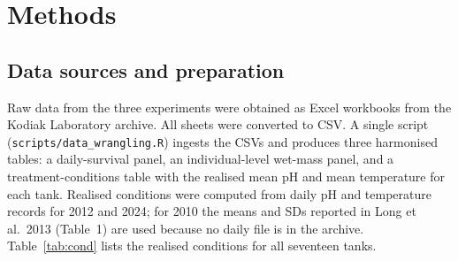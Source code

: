\documentclass[11pt]{article}
\begin{document}
\section{Methods}

\subsection{Data sources and preparation}
Raw data from the three experiments were obtained as Excel workbooks from the Kodiak Laboratory archive. All sheets were converted to CSV. A single script (\texttt{scripts/data\_wrangling.R}) ingests the CSVs and produces three harmonised tables: a daily-survival panel, an individual-level wet-mass panel, and a treatment-conditions table with the realised mean pH and mean temperature for each tank. Realised conditions were computed from daily pH and temperature records for 2012 and 2024; for 2010 the means and SDs reported in Long et al.\ 2013 (Table~1) are used because no daily file is in the archive. Table~\ref{tab:cond} lists the realised conditions for all seventeen tanks.
\end{document}

